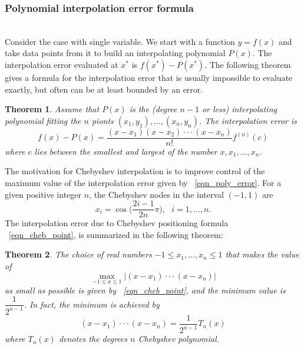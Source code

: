 \documentclass[11pt]{amsart}
\newtheorem{theorem}{Theorem}%
\theoremstyle{definition}
\begin{document}
\subsubsection{Polynomial interpolation error formula}~\\
Consider the case with single variable. We start with a function $y=f(x)$ and take data points from it to build an interpolating polynomial $P(x)$. The interpolation error evaluated at $x^*$ is $f(x^*)-P(x^*)$. The following theorem gives a formula for the interpolation error that is usually impossible to evaluate exactly, but often can be at least bounded by an error.
\begin{theorem}
Assume that $P(x)$ is the (degree $n-1$ or less) interpolating polynomial fitting the $n$ pionts $(x_1,y_1),...,(x_n,y_n)$. The interpolation error is 
\begin{equation} \label{eqn_poly_error}
f(x)-P(x)=\frac{(x-x_1)(x-x_2)\cdot\cdot\cdot(x-x_n)}{n!}f^{(n)}(c)
\end{equation}
where $c$ lies between the smallest and largest of the number $x,x_1,...,x_n.$
\end{theorem}
The motivation for Chebyshev interpolation is to improve control of the maximum value of the interpolation error given by ~\eqref{eqn_poly_error}. For a given positive integer $n$, the Chebyshev nodes in the interval $(-1,1)$ are
\begin{equation}
\label{eqn_cheb_point}
x_i=\cos\Big(\frac{2i-1}{2n}\pi\Big),\mbox{ }i=1,...,n.
\end{equation}
The interpolation error due to Chebyshev positioning formula ~\eqref{eqn_cheb_point}, is summarized in the following theorem:
\begin{theorem}
The choice of real numbers $-1\le x_1,...,x_n\le 1$ that makes the value of 
\begin{equation}
\max_{-1 \leq x \leq 1}|(x-x_1)\cdot\cdot\cdot(x-x_n)|
\end{equation}
as small as possible is given by ~\eqref{eqn_cheb_point}, and the minimum value is $\dfrac{1}{2^{n-1}}$. In fact, the minimum is achieved by 
\begin{equation} \label{eqn_cheb_error}
(x-x_1)\cdot\cdot\cdot(x-x_n)=\frac{1}{2^{n-1}}T_n(x)
\end{equation}
where $T_n(x)$ denotes the degrees $n$ Chebyshev polynomial.
\end{theorem}
\end{document}
